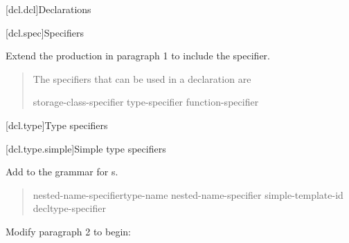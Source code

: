 
\setcounter{chapter}{6}
[dcl.dcl]{Declarations}


[dcl.spec]{Specifiers}

Extend the  production
in paragraph 1 to include the  specifier.

\begin{quote}
\pnum
The specifiers that can be used in a declaration are

\begin{bnf}
\br
    storage-class-specifier\br
    type-specifier\br
    function-specifier\br
    \br
    \br
    \br
\end{bnf}
\end{quote}


\setcounter{subsection}{5}
[dcl.type]{Type specifiers}


\setcounter{subsubsection}{1}
[dcl.type.simple]{Simple type specifiers}
        
Add 
to the grammar for s.

\begin{quote}
\begin{bnf}
\br
    nested-name-specifier\opt type-name\br
    nested-name-specifier  simple-template-id\br
    \br
    \br
    \br
    \br
    \br
    \br
    \br
    \br
    \br
    \br
    \br
    \br
    \br
    \br
    decltype-specifier\br
\end{bnf}
\end{quote}

Modify paragraph 2 to begin:

\begin{quote}
\pnum
{}
\end{quote}

